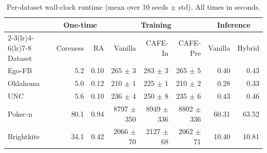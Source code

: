 \begin{table}[t]
\caption{Per-dataset wall-clock runtime (mean over 10 seeds $\pm$ std). All times in seconds.}
\label{tab:runtime}
\centering
\small
\begin{tabular}{lrrrrrrr}
\toprule
 & \multicolumn{2}{c}{One-time} & \multicolumn{3}{c}{Training} & \multicolumn{2}{c}{Inference} \\
\cmidrule(lr){2-3}\cmidrule(lr){4-6}\cmidrule(lr){7-8}
Dataset & Coreness & RA & Vanilla & CAFE-In & CAFE-Pre & Vanilla & Hybrid \\
\midrule
Ego-FB & 5.2 & 0.10 & 265 $\pm$ 3 & 283 $\pm$ 3 & 265 $\pm$ 5 & 0.40 & 0.43 \\
Oklahoma & 5.0 & 0.12 & 210 $\pm$ 1 & 225 $\pm$ 1 & 210 $\pm$ 2 & 0.28 & 0.33 \\
UNC & 5.6 & 0.10 & 236 $\pm$ 4 & 250 $\pm$ 8 & 235 $\pm$ 6 & 0.43 & 0.46 \\
Pokec-n & 80.1 & 0.94 & 8797 $\pm$ 350 & 8949 $\pm$ 336 & 8802 $\pm$ 336 & 60.31 & 63.52 \\
Brightkite & 34.1 & 0.42 & 2066 $\pm$ 70 & 2127 $\pm$ 68 & 2062 $\pm$ 71 & 10.40 & 10.81 \\
\bottomrule
\end{tabular}
\end{table}
